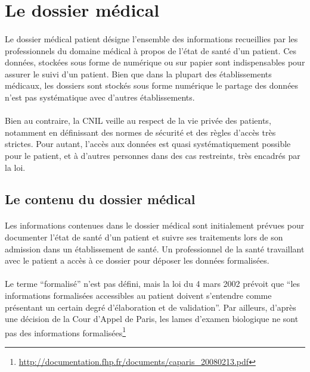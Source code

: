    \section{Le dossier médical}


\paragraph{}
Le dossier médical patient désigne l'ensemble des informations recueillies par
les professionnels du domaine médical à propos de l'état de santé d'un patient.
Ces données, stockées sous forme de numérique ou sur papier sont indispensables
pour assurer le suivi d'un patient. Bien que dans la plupart des établissements
médicaux, les dossiers sont stockés sous forme numérique le partage des données
n'est pas systématique avec d'autres établissements.

\paragraph{}
Bien au contraire, la CNIL veille au respect de la vie privée des patients,
notamment en définissant des normes de sécurité et des règles d'accès très
strictes. Pour autant, l'accès aux données est quasi systématiquement possible
pour le patient, et à d'autres personnes dans des cas restreints, très encadrés
par la loi.


        \subsection{Le contenu du dossier médical}

\paragraph{}
Les informations contenues dans le dossier médical sont initialement prévues
pour documenter l'état de santé d'un patient et suivre ses traitements lors de
son admission dans un établissement de santé.  Un professionnel de la santé
travaillant avec le patient a accès à ce dossier pour déposer les données
formalisées.

\paragraph{}
Le terme ``formalisé'' n'est pas défini, mais la loi du 4 mars 2002 prévoit que
``les informations formalisées accessibles au patient doivent s'entendre comme
présentant un certain degré d'élaboration et de validation''. Par ailleurs,
d'après une décision de la Cour d'Appel de Paris, les lames d'examen biologique
ne sont pas des informations
formalisées\footnote{\url{http://documentation.fhp.fr/documents/caparis_20080213.pdf}}

